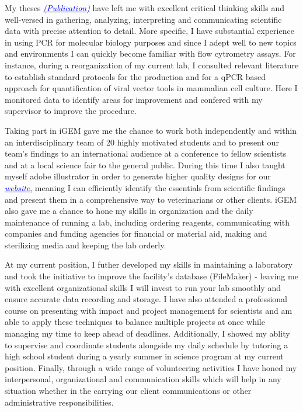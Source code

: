 \documentclass[11pt,a4paper,sans]{moderncv}
\begin{document}
\begin{spacing}{1.2}
My theses {\href{https://www.ncbi.nlm.nih.gov/pubmed/29517395}{\textcolor{blue}{{\textit{(Publication)}}}}} have left me with excellent critical thinking skills and well-versed in gathering, analyzing, interpreting and communicating scientific data with precise attention to detail. More specific, I have substantial experience in using PCR for molecular biology purposes and since I adept well to new topics and environments I can quickly become familiar with flow cytrometry assays. For instance, during a reorganization of my current lab, I consulted relevant literature to establish standard protocols for the production and for a qPCR based approach for quantification of viral vector tools in mammalian cell culture. Here I monitored data to identify areas for improvement and confered with my supervisor to improve the procedure. \par%
Taking part in iGEM gave me the chance to work both independently and within an interdisciplinary team of 20 highly motivated students and to present our team's findings to an international audience at a conference to fellow scientists and at a local science fair to the general public. During this time I also taught myself adobe illustrator in order to generate higher quality designs for our {\href{http://2015.igem.org/Team:Freiburg}{\textcolor{blue}{\textit{website}}}}, meaning I can efficiently identify the essentials from scientific findings and present them in a comprehensive way to veterinarians or other clients. iGEM also gave me a chance to hone my skills in organization and the daily maintenance of running a lab, including ordering reagents, communicating with companies and funding agencies for financial or material aid, making and sterilizing media and keeping the lab orderly. \par 
At my current position, I futher developed my skills in maintaining a laboratory and took the initiative to improve the facility's database (FileMaker) - leaving me with excellent organizational skills I will invest to run your lab smoothly and ensure accurate data recording and storage. I have also attended a professional course on presenting with impact and project management for scientists and am able to apply these techniques to balance multiple projects at once while managing my time to keep ahead of deadlines. Additionally, I showed my ablity to supervise and coordinate students alongside my daily schedule by tutoring a high school student during a yearly summer in science program at my current position. Finally, through a wide range of volunteering activities I have honed my interpersonal, organizational and communication skills which will help in any situation whether in the carrying our client communications or other administrative responsibilities.\par%



\end{spacing}
\end{document}
